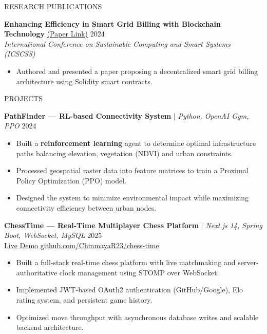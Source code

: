 \documentclass{resume}
\begin{document}
\begin{rSection}{RESEARCH PUBLICATIONS}

\textbf{Enhancing Efficiency in Smart Grid Billing with Blockchain Technology}
\href{https://ieeexplore.ieee.org/abstract/document/10625244}{(Paper Link)} \hfill {2024} \\
\textit{International Conference on Sustainable Computing and Smart Systems (ICSCSS)}
\begin{itemize}
    \item Authored and presented a paper proposing a decentralized smart grid billing architecture using Solidity smart contracts.
\end{itemize}

\end{rSection}

\begin{rSection}{PROJECTS}

\textbf{PathFinder — RL-based Connectivity System} $|$ \textit{Python, OpenAI Gym, PPO} \hfill {2024}
\begin{itemize}
    \item Built a \textbf{reinforcement learning} agent to determine optimal infrastructure paths balancing elevation, vegetation (NDVI) and urban constraints.
    \item Processed geospatial raster data into feature matrices to train a Proximal Policy Optimization (PPO) model.
    \item Designed the system to minimize environmental impact while maximizing connectivity efficiency between urban nodes.
\end{itemize}

\textbf{ChessTime — Real-Time Multiplayer Chess Platform} $|$ \textit{Next.js 14, Spring Boot, WebSocket, MySQL} \hfill {2025} \\
\href{https://chesstime.duckdns.org/}{Live Demo} \quad
\href{https://github.com/ChinmayaR23/chess-time}{github.com/ChinmayaR23/chess-time}
\begin{itemize}
    \item Built a full-stack real-time chess platform with live matchmaking and server-authoritative clock management using STOMP over WebSocket.
    \item Implemented JWT-based OAuth2 authentication (GitHub/Google), Elo rating system, and persistent game history.
    \item Optimized move throughput with asynchronous database writes and scalable backend architecture.
\end{itemize}

\end{rSection}
\end{document}
